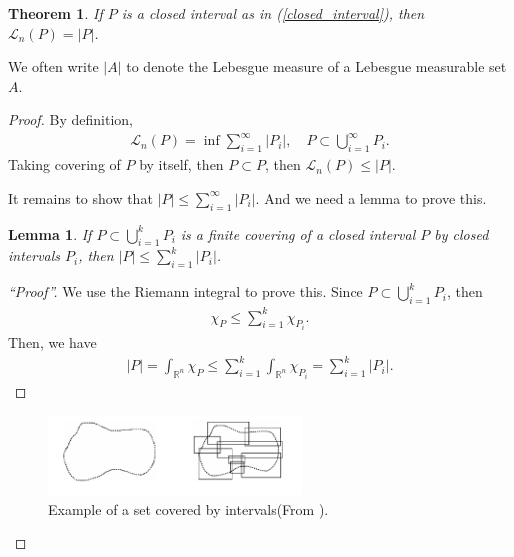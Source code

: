 \documentclass[11pt]{book}
\newtheorem{theorem}{Theorem}[chapter]
\newtheorem{lemma}{Lemma}[chapter]
\theoremstyle{definition}
\numberwithin{equation}{chapter}
\begin{document}
\medskip

\begin{theorem}\label{theorem_125}
If $P$ is a closed interval as in (\ref{closed_interval}), then $\mathcal{L}_n(P) = \left|P\right|$.
\end{theorem}

We often write $\left|A\right|$ to denote the Lebesgue measure of a Lebesgue measurable set $A$.

\begin{proof}
By definition,
\begin{align*}
    \mathcal{L}_n(P) = \inf \sum^\infty_{i=1} \left|P_i\right|, \quad P \subset \bigcup^\infty_{i=1} P_i.
\end{align*}
Taking covering of $P$ by itself, then $P \subset P$, then $\mathcal{L}_n(P) \leq \left|P\right|$.

It remains to show that $\left|P\right| \leq \sum^\infty_{i=1} \left|P_i\right|$. And we need a lemma to prove this.

\begin{lemma}\label{lemma_121}
If $P \subset \bigcup^k_{i=1} P_i$ is a finite covering of a closed interval $P$ by closed intervals $P_i$, then $\left|P\right| \leq \sum^k_{i=1} \left|P_i\right|$.
\end{lemma}
\begin{proof}[``Proof'']
We use the Riemann integral to prove this. Since $P \subset \bigcup^k_{i=1} P_i$, then
\begin{align*}
    \chi_P \leq \sum^k_{i=1} \chi_{P_i}.
\end{align*}
Then, we have
\begin{align*}
    \left|P\right| = \int_{\mathbb{R}^n} \chi_P \leq \sum^k_{i=1} \int_{\mathbb{R}^n} \chi_{P_i} = \sum^k_{i=1} \left|P_i\right|.
\end{align*}
\end{proof}
\begin{figure}[H]
    \centering
    \includegraphics[width=0.6\textwidth]{closed_interval_covering.png}
    \caption{Example of a set covered by intervals(From \cite{6}).}
    \label{fig:closed_intervals}
\end{figure}


\end{proof}
\end{document}

